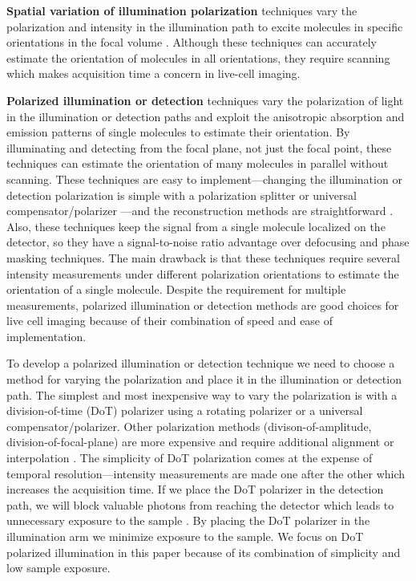 \documentclass[10pt]{article}
\begin{document}
\textbf{Spatial variation of illumination polarization} techniques vary the
polarization and intensity in the illumination path to excite molecules in
specific orientations in the focal volume \cite{debarre2004}. Although these
techniques can accurately estimate the orientation of molecules in all
orientations, they require scanning which makes acquisition time a concern in
live-cell imaging.

\textbf{Polarized illumination or detection} techniques vary the polarization of
light in the illumination or detection paths and exploit the anisotropic
absorption and emission patterns of single molecules to estimate their
orientation. By illuminating and detecting from the focal plane, not just the
focal point, these techniques can estimate the orientation of many molecules in
parallel without scanning. These techniques are easy to implement---changing the
illumination or detection polarization is simple with a polarization splitter
\cite{mehta2016} or universal compensator/polarizer \cite{shribak2003}---and the
reconstruction methods are straightforward \cite{fourkas2001, mehta2016,
  backer2016}. Also, these techniques keep the signal from a single molecule
localized on the detector, so they have a signal-to-noise ratio advantage over
defocusing and phase masking techniques. The main drawback is that these
techniques require several intensity measurements under different polarization
orientations to estimate the orientation of a single molecule. Despite the
requirement for multiple measurements, polarized illumination or detection
methods are good choices for live cell imaging because of their combination of
speed and ease of implementation.

To develop a polarized illumination or detection technique we need to choose a
method for varying the polarization and place it in the illumination or
detection path. The simplest and most inexpensive way to vary the polarization
is with a division-of-time (DoT) polarizer using a rotating polarizer or a
universal compensator/polarizer. Other polarization methods
(divison-of-amplitude, division-of-focal-plane) are more expensive and require
additional alignment or interpolation \cite{tyo2006}. The simplicity of DoT
polarization comes at the expense of temporal resolution---intensity
measurements are made one after the other which increases the acquisition
time. If we place the DoT polarizer in the detection path, we will block
valuable photons from reaching the detector which leads to unnecessary exposure
to the sample \cite{demay2011}. By placing the DoT polarizer in the illumination
arm we minimize exposure to the sample. We focus on DoT polarized illumination
in this paper because of its combination of simplicity and low sample exposure.
\end{document}
